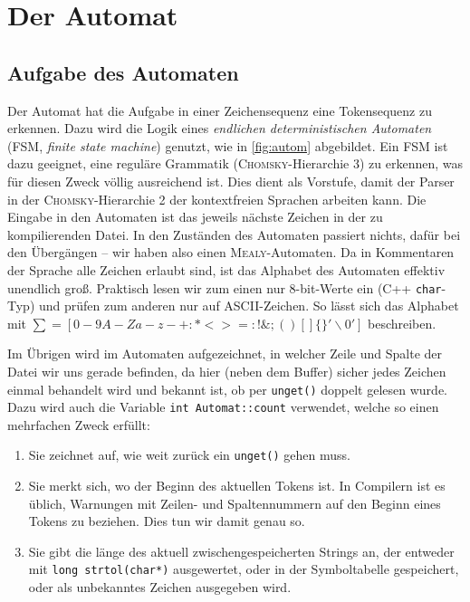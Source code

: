 \documentclass[
a4paper,   %
11pt,      %
oneside,   %
onecolumn, %
final      %
]{article}
\newcommand{\code}[1]{\lstinline$#1$}
\begin{document}
\section{Der Automat} \label{sec:autom}

\subsection{Aufgabe des Automaten}
Der Automat hat die Aufgabe in einer Zeichensequenz eine Tokensequenz zu erkennen.
Dazu wird die Logik eines \emph{endlichen deterministischen Automaten} (FSM, \emph{finite state machine}) genutzt, wie in \ref{fig:autom} abgebildet.
Ein FSM ist dazu geeignet, eine reguläre Grammatik (\textsc{Chomsky}-Hierarchie 3) zu erkennen, was für diesen Zweck völlig ausreichend ist. Dies dient als Vorstufe, damit der Parser in der \textsc{Chomsky}-Hierarchie 2 der kontextfreien Sprachen arbeiten kann.
Die Eingabe in den Automaten ist das jeweils nächste Zeichen in der zu kompilierenden Datei.
In den Zuständen des Automaten passiert nichts, dafür bei den Übergängen -- wir haben also einen \textsc{Mealy}-Automaten.
Da in Kommentaren der Sprache alle Zeichen erlaubt sind, ist das Alphabet des Automaten effektiv unendlich groß.
Praktisch lesen wir zum einen nur 8-bit-Werte ein (C++ \code{char}-Typ) und prüfen zum anderen nur auf ASCII-Zeichen.
So lässt sich das Alphabet mit $\sum = [0-9A-Za-z-+:*<>=:!\&;()[]\{\}'\backslash0']$ beschreiben.

Im Übrigen wird im Automaten aufgezeichnet, in welcher Zeile und Spalte der Datei wir uns gerade befinden, da hier (neben dem Buffer) sicher jedes Zeichen einmal behandelt wird und bekannt ist, ob per \code{unget()} doppelt gelesen wurde.
Dazu wird auch die Variable \code{int Automat::count} verwendet, welche so einen mehrfachen Zweck erfüllt:
\begin{enumerate}
\item Sie zeichnet auf, wie weit zurück ein \code{unget()} gehen muss.
\item Sie merkt sich, wo der Beginn des aktuellen Tokens ist. In Compilern ist es üblich, Warnungen mit Zeilen- und Spaltennummern auf den Beginn eines Tokens zu beziehen. Dies tun wir damit genau so.
\item Sie gibt die länge des aktuell zwischengespeicherten Strings an, der entweder mit \code{long strtol(char*)} ausgewertet, oder in der Symboltabelle gespeichert, oder als unbekanntes Zeichen ausgegeben wird.
\end{enumerate}
\end{document}
